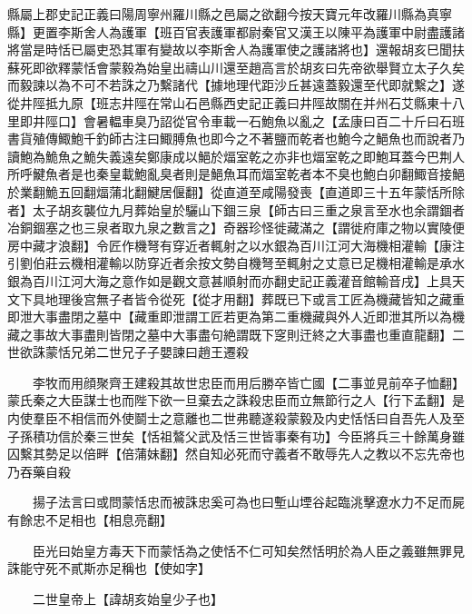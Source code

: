 縣屬上郡史記正義曰陽周寧州羅川縣之邑屬之欲翻今按天寶元年改羅川縣為真寧縣】更置李斯舍人為護軍【班百官表護軍都尉秦官又漢王以陳平為護軍中尉盡護諸將當是時恬已屬吏恐其軍有變故以李斯舍人為護軍使之護諸將也】還報胡亥巳聞扶蘇死即欲釋蒙恬會蒙毅為始皇出禱山川還至趙高言於胡亥曰先帝欲舉賢立太子久矣而毅諫以為不可不若誅之乃繫諸代【據地理代距沙丘甚遠蓋毅還至代即就繫之】遂從井陘抵九原【班志井陘在常山石邑縣西史記正義曰井陘故關在并州石艾縣東十八里即井陘口】會暑輼車臭乃詔從官令車載一石鮑魚以亂之【孟康曰百二十斤曰石班書貨殖傳鯫鮑千釣師古注曰鯫膊魚也即今之不著鹽而乾者也鮑今之䱒魚也而說者乃讀鮑為鮠魚之鮠失義遠矣鄭康成以䱒於煏室乾之亦非也煏室乾之即鮑耳蓋今巴荆人所呼鰎魚者是也秦皇載鮑亂臭者則是䱒魚耳而煏室乾者本不臭也鮑白卯翻鯫音接䱒於業翻鮠五回翻煏蒲北翻鰎居偃翻】從直道至咸陽發喪【直道即三十五年蒙恬所除者】太子胡亥襲位九月葬始皇於驪山下錮三泉【師古曰三重之泉言至水也余謂錮者冶銅錮塞之也三泉者取九泉之數言之】奇器珍怪徙藏滿之【謂徙府庫之物以實陵便房中藏才浪翻】令匠作機弩有穿近者輒射之以水銀為百川江河大海機相灌輸【康注引劉伯莊云機相灌輸以防穿近者余按文勢自機弩至輒射之丈意已足機相灌輸是承水銀為百川江河大海之意作如是觀文意甚順射而亦翻史記正義灌音館輸音戌】上具天文下具地理後宫無子者皆令從死【從才用翻】葬既已下或言工匠為機藏皆知之藏重即泄大事盡閉之墓中【藏重即泄謂工匠若更為第二重機藏與外人近即泄其所以為機藏之事故大事盡則皆閉之墓中大事盡句絶謂既下窆則迀終之大事盡也重直龍翻】二世欲誅蒙恬兄弟二世兄子子嬰諫曰趙王遷殺

　　李牧而用顔聚齊王建殺其故世忠臣而用后勝卒皆亡國【二事並見前卒子恤翻】蒙氏秦之大臣謀士也而陛下欲一旦棄去之誅殺忠臣而立無節行之人【行下孟翻】是内使羣臣不相信而外使鬬士之意離也二世弗聽遂殺蒙毅及内史恬恬曰自吾先人及至子孫積功信於秦三世矣【恬祖鷔父武及恬三世皆事秦有功】今臣將兵三十餘萬身雖囚繫其勢足以倍畔【倍蒲妹翻】然自知必死而守義者不敢辱先人之教以不忘先帝也乃吞藥自殺

　　揚子法言曰或問蒙恬忠而被誅忠奚可為也曰塹山堙谷起臨洮擊遼水力不足而屍有餘忠不足相也【相息亮翻】

　　臣光曰始皇方毒天下而蒙恬為之使恬不仁可知矣然恬明於為人臣之義雖無罪見誅能守死不貳斯亦足稱也【使如字】

　　二世皇帝上【諱胡亥始皇少子也】

